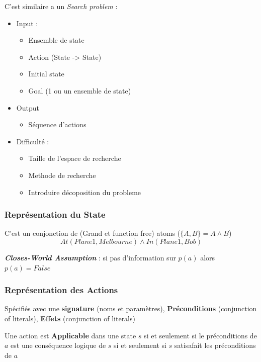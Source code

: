 \documentclass[12pt]{article}
\begin{document}
		C'est similaire a un \textit{Search problem} :
		\begin{itemize}
			\item Input :
			\begin{itemize}
				\item Ensemble de state
				\item Action (State -> State)
				\item Initial state
				\item Goal (1 ou un ensemble de state)
			\end{itemize}
			\item Output
				\begin{itemize}
					\item Séquence d'actions
				\end{itemize}
				
			\item Difficulté : 
				\begin{itemize}
					\item Taille de l'espace de recherche
					\item Methode de recherche
					\item Introduire décoposition du probleme
				\end{itemize}
		\end{itemize}
		
		\subsubsection{Représentation du State}
			C'est un conjonction de (Grand et function free) atoms ($\{A,B\} = A\land B$)
			\begin{equation}
				At(Plane1, Melbourne) \land In(Plane1, Bob)
			\end{equation}
			
			\textbf{\textit{Closes-World Assumption}} : si pas d'information sur $p(a)$ alors $p(a) = False$
			
		\subsubsection{Représentation des Actions}
			Spécifiés avec une \textbf{signature} (noms et paramètres), \textbf{Préconditions} (conjunction of literals), \textbf{Effets} (conjunction of literals)
			
			Une action est \textbf{Applicable} dans une state $s$ si et seulement si le préconditions de $a$ est une conséquence logique de $s$ si et seulement si $s$ satisafait les préconditions de $a$
			
\end{document}
